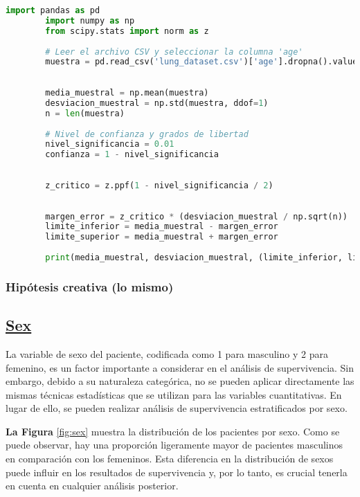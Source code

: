 \documentclass[a4paper,12pt]{article}
\begin{document}
    \begin{lstlisting}[language=Python, caption={Código en Python para calcular el intervalo de confianza}]
        import pandas as pd
        import numpy as np
        from scipy.stats import norm as z
        
        # Leer el archivo CSV y seleccionar la columna 'age'
        muestra = pd.read_csv('lung_dataset.csv')['age'].dropna().values
        
        
        media_muestral = np.mean(muestra)
        desviacion_muestral = np.std(muestra, ddof=1)
        n = len(muestra)
        
        # Nivel de confianza y grados de libertad
        nivel_significancia = 0.01
        confianza = 1 - nivel_significancia
        
    
        z_critico = z.ppf(1 - nivel_significancia / 2)
        
        
        margen_error = z_critico * (desviacion_muestral / np.sqrt(n))
        limite_inferior = media_muestral - margen_error
        limite_superior = media_muestral + margen_error
        
        print(media_muestral, desviacion_muestral, (limite_inferior, limite_superior))
        \end{lstlisting}

    \subsubsection*{Hipótesis creativa (lo mismo)}

    \subsection*{\underline{Sex}}

    La variable de sexo del paciente, codificada como 1 para masculino y 2 para femenino, es un factor importante a considerar en el análisis de supervivencia. Sin embargo, debido a su naturaleza categórica, no se pueden aplicar directamente las mismas técnicas estadísticas que se utilizan para las variables cuantitativas. En lugar de ello, se pueden realizar análisis de supervivencia estratificados por sexo.
    
    \textbf{La Figura }\ref{fig:sex} muestra la distribución de los pacientes por sexo. Como se puede observar, hay una proporción ligeramente mayor de pacientes masculinos en comparación con los femeninos. Esta diferencia en la distribución de sexos puede influir en los resultados de supervivencia y, por lo tanto, es crucial tenerla en cuenta en cualquier análisis posterior.
\end{document}
